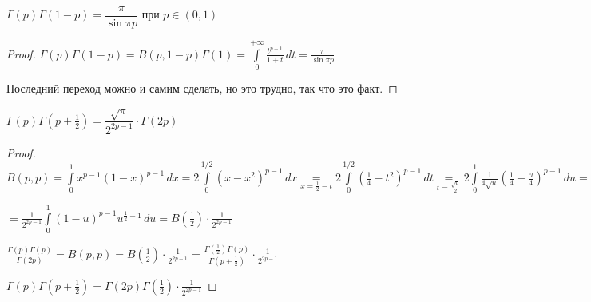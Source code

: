 
\begin{consequence}\thmslashn
	
	$\Gamma(p)\Gamma(1-p) = \dfrac{\pi}{\sin \pi p}$ при $p \in (0, 1)$
	
\end{consequence}

\begin{proof}\thmslashn
	
	$\Gamma(p)\Gamma(1-p) = B(p, 1-p)\Gamma(1) = \int\limits_{0}^{+\infty} \frac{t^{p-1}}{1+t} \,dt = \frac{\pi}{\sin \pi p}$
	
	Последний переход можно и самим сделать, но это трудно, так что это факт.
	
\end{proof}


\begin{consequence}\thmslashn
	
	$\Gamma(p)\Gamma\left(p+\frac{1}{2}\right) = \dfrac{\sqrt{\pi}}{2^{2p-1}}\cdot \Gamma(2p)$
	
\end{consequence}

\begin{proof}\thmslashn
	
	$B(p, p) = \int\limits_{0}^{1} x^{p-1}(1-x)^{p-1}\,dx = 2 \int\limits_{0}^{1/2} (x-x^2)^{p-1}\,dx \underset{x = \frac{1}{2} - t} = 2 \int\limits_{0}^{1/2} \left(\frac{1}{4} - t^2 \right)^{p-1}\,dt \underset{t = \frac{\sqrt{u}}{2}}= 2 \int\limits_{0}^{1} \frac{1}{4\sqrt{u}}\left(\frac{1}{4} - \frac{u}{4} \right)^{p-1} \,du =$
	
	$= \frac{1}{2^{2p-1}} \int\limits_{0}^1 (1-u)^{p-1} u^{\frac{1}{2}-1}\,du = B\left(\frac{1}{2} \right) \cdot \frac{1}{2^{2p-1}}$
	
	$\frac{\Gamma(p)\Gamma(p)}{\Gamma(2p)} = B(p, p) = B\left(\frac{1}{2} \right) \cdot \frac{1}{2^{2p-1}} = \frac{\Gamma\left(\frac{1}{2} \right)\Gamma(p)}{\Gamma\left(p+\frac{1}{2} \right)} \cdot \frac{1}{2^{2p-1}}$
	
	$\Gamma(p)\Gamma\left(p+\frac{1}{2} \right) = \Gamma\left(2p\right)\Gamma\left(\frac{1}{2} \right)\cdot \frac{1}{2^{2p-1}}$
	
\end{proof}
